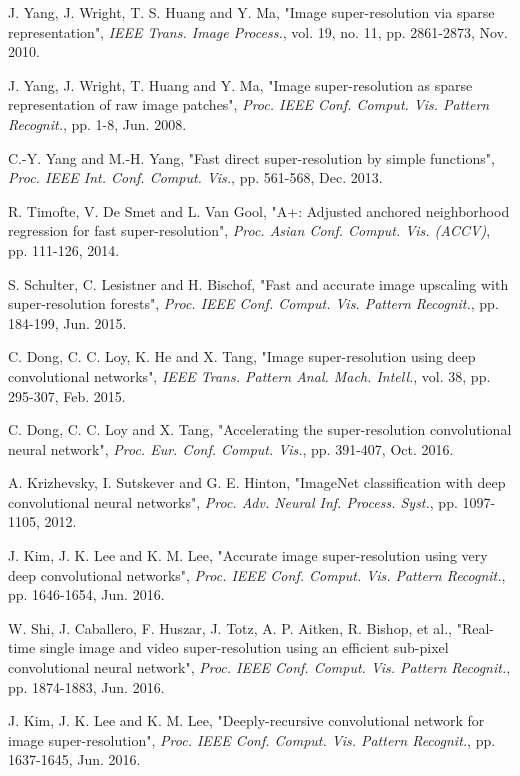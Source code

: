 \documentclass{ieeeaccess}
\begin{document}
\begin{thebibliography}{00}

 J. Yang, J. Wright, T. S. Huang and Y. Ma, "Image super-resolution via sparse representation", \textit{IEEE Trans. Image Process.}, vol. 19, no. 11, pp. 2861-2873, Nov. 2010.


 J. Yang, J. Wright, T. Huang and Y. Ma, "Image super-resolution as sparse representation of raw image patches", \textit{Proc. IEEE Conf. Comput. Vis. Pattern Recognit.}, pp. 1-8, Jun. 2008.


 C.-Y. Yang and M.-H. Yang, "Fast direct super-resolution by simple functions", \textit{Proc. IEEE Int. Conf. Comput. Vis.}, pp. 561-568, Dec. 2013.


 R. Timofte, V. De Smet and L. Van Gool, "A+: Adjusted anchored neighborhood regression for fast super-resolution", \textit{Proc. Asian Conf. Comput. Vis. (ACCV)}, pp. 111-126, 2014.


 S. Schulter, C. Lesistner and H. Bischof, "Fast and accurate image upscaling with super-resolution forests", \textit{Proc. IEEE Conf. Comput. Vis. Pattern Recognit.}, pp. 184-199, Jun. 2015.


 C. Dong, C. C. Loy, K. He and X. Tang, "Image super-resolution using deep convolutional networks", \textit{IEEE Trans. Pattern Anal. Mach. Intell.}, vol. 38, pp. 295-307, Feb. 2015.


 C. Dong, C. C. Loy and X. Tang, "Accelerating the super-resolution convolutional neural network", \textit{Proc. Eur. Conf. Comput. Vis.}, pp. 391-407, Oct. 2016.


 A. Krizhevsky, I. Sutskever and G. E. Hinton, "ImageNet classification with deep convolutional neural networks", \textit{Proc. Adv. Neural Inf. Process. Syst.}, pp. 1097-1105, 2012.


 J. Kim, J. K. Lee and K. M. Lee, "Accurate image super-resolution using very deep convolutional networks", \textit{Proc. IEEE Conf. Comput. Vis. Pattern Recognit.}, pp. 1646-1654, Jun. 2016.


 W. Shi, J. Caballero, F. Huszar, J. Totz, A. P. Aitken, R. Bishop, et al., "Real-time single image and video super-resolution using an efficient sub-pixel convolutional neural network", \textit{Proc. IEEE Conf. Comput. Vis. Pattern Recognit.}, pp. 1874-1883, Jun. 2016.



 J. Kim, J. K. Lee and K. M. Lee, "Deeply-recursive convolutional network for image super-resolution", \textit{Proc. IEEE Conf. Comput. Vis. Pattern Recognit.}, pp. 1637-1645, Jun. 2016.



\end{thebibliography}
\end{document}
